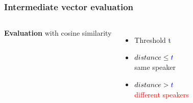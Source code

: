 \documentclass[11pt,english]{beamer}
\begin{document}
\begin{frame}
  \frametitle{Intermediate vector evaluation}
  \begin{columns}

   \textbf{Evaluation} with cosine similarity



    \begin{itemize}\setlength\itemsep{2em}
    \item[] Threshold \textcolor{blue}{t}
    \item[] $distance \leq \textcolor{blue}{t}$ \\
      \textcolor{mygreen}{same speaker}
    \item[] $distance > \textcolor{blue}{t}$ \\
      \textcolor{red}{different speakers}
    \end{itemize}


  \end{columns}

\end{frame}



\newsavebox{\trainingdata}



\newsavebox{\validationdata}

\newsavebox{\dataset}
\end{document}
